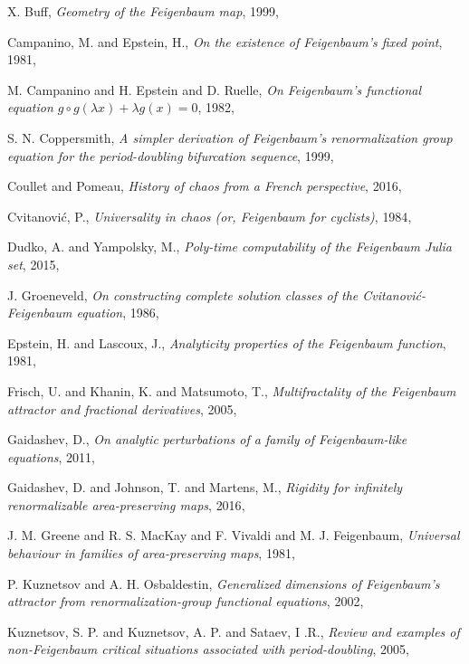\begin{description}
{X. Buff},
{\em Geometry of the {Feigenbaum} map},
{1999},

{Campanino, M. and Epstein, H.},
{\em On the existence of {Feigenbaum's} fixed point},
{1981},

{M. Campanino and H. Epstein and D. Ruelle},
{\em On {Feigenbaum}'s functional equation {$g \circ g(\lambda x) + \lambda g(x) = 0$}},
{1982},

{S. N. Coppersmith},
{\em A simpler derivation of {Feigenbaum}'s renormalization group equation for the period-doubling bifurcation sequence},
{1999},

{Coullet and Pomeau},
{\em History of chaos from a {French} perspective},
{2016},

{Cvitanovi{\'c}, P.},
{\em Universality in chaos (or, {Feigenbaum} for cyclists)},
{1984},

{Dudko, A. and Yampolsky, M.},
  {\em Poly-time computability of the {Feigenbaum Julia} set},
{2015},

{J. Groeneveld},
{\em On constructing complete solution classes of the {Cvitanovi{\'c}-Feigenbaum} equation},
{1986},

{Epstein, H. and Lascoux, J.},
{\em Analyticity properties of the {Feigenbaum} function},
{1981},

{Frisch, U. and Khanin, K. and Matsumoto, T.},
{\em Multifractality of the {Feigenbaum} attractor and fractional derivatives},
{2005},

{Gaidashev, D.},
{\em On analytic perturbations of a family of {Feigenbaum}-like equations},
 {2011},

{Gaidashev, D. and Johnson, T. and Martens, M.},
{\em Rigidity for infinitely renormalizable area-preserving maps},
{2016},

{J. M. Greene and R. S. MacKay and F. Vivaldi and M. J. Feigenbaum},
{\em Universal behaviour in families of area-preserving maps},
{1981},

{P. Kuznetsov and A. H. Osbaldestin},
{\em Generalized dimensions of {Feigenbaum}'s attractor from renormalization-group functional equations},
{2002},

{Kuznetsov, S. P. and Kuznetsov, A. P. and Sataev, I .R.},
{\em Review and examples of non-{Feigenbaum} critical situations associated with period-doubling},
{2005},


\end{description}
